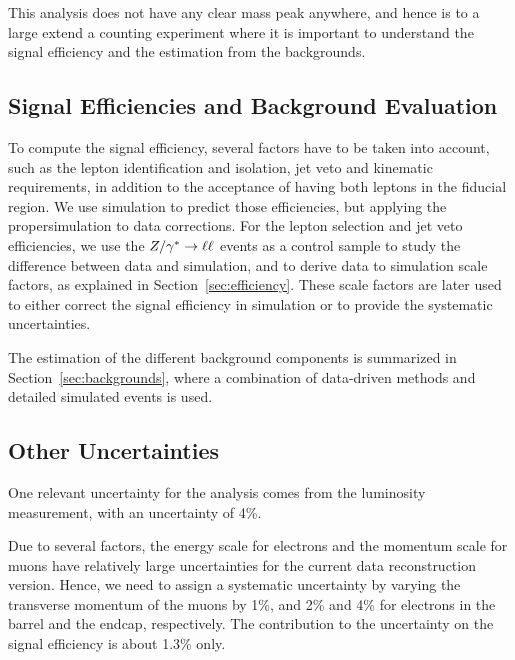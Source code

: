 This analysis does not have any clear mass peak anywhere, and hence is to a 
large extend a counting experiment where it is important to understand the 
signal efficiency and the estimation from the backgrounds. 

\subsection{Signal Efficiencies and Background Evaluation}
To compute the signal efficiency, several factors have to be taken into 
account, such as the lepton identification and isolation, jet veto and 
kinematic requirements, in addition to the acceptance of having both leptons in 
the fiducial region. We use simulation to predict those efficiencies, but 
applying the propersimulation to data corrections. For the lepton selection 
and jet veto efficiencies, we use the $Z/\gamma^*\to\ell\ell$ events as a control sample to 
study the difference between data and simulation, and to derive data to 
simulation scale factors, as explained in Section~\ref{sec:efficiency}. These 
scale factors are later used to either correct the signal efficiency in 
simulation or to provide the systematic uncertainties. 

The estimation of the different background components is summarized in
Section~\ref{sec:backgrounds}, where a combination of data-driven methods and 
detailed simulated events is used.

\subsection{Other Uncertainties}
One relevant uncertainty for the analysis comes from the luminosity 
measurement, with an uncertainty of 4\%.

Due to several factors, the energy scale for electrons and the momentum 
scale for muons have relatively large uncertainties for the current data 
reconstruction version. Hence, we need to assign a systematic uncertainty by 
varying the transverse momentum of the muons by 1\%, 
and 2\% and 4\% for electrons in the barrel and the endcap, respectively. 
The contribution to the uncertainty on the signal efficiency is about 1.3\% 
only.

